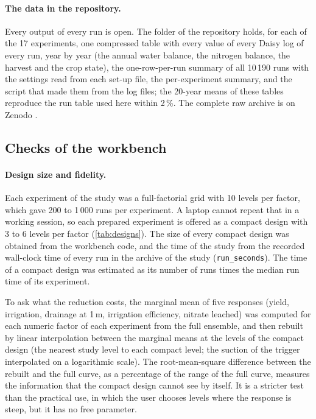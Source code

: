 \paragraph{The data in the repository.} Every output of every run is open. The folder \cslink{} of the repository holds, for each of the 17 experiments, one compressed table with every value of every Daisy log of every run, year by year (the annual water balance, the nitrogen balance, the harvest and the crop state), the one-row-per-run summary of all 10\,190 runs with the settings read from each set-up file, the per-experiment summary, and the script that made them from the log files; the 20-year means of these tables reproduce the run table used here within 2\,\%. The complete raw archive is on Zenodo \citep{HaliluData}.




\subsection{Checks of the workbench}
\paragraph{Design size and fidelity.}
Each experiment of the study was a full-factorial grid with 10 levels per factor, which gave 200 to 1\,000 runs per experiment. A laptop cannot repeat that in a working session, so each prepared experiment is offered as a compact design with 3 to 6 levels per factor (\cref{tab:designs}). The size of every compact design was obtained from the workbench code, and the time of the study from the recorded wall-clock time of every run in the archive of the study (\texttt{run\_seconds}). The time of a compact design was estimated as its number of runs times the median run time of its experiment.

To ask what the reduction costs, the marginal mean of five responses (yield, irrigation, drainage at 1\,m, irrigation efficiency, nitrate leached) was computed for each numeric factor of each experiment from the full ensemble, and then rebuilt by linear interpolation between the marginal means at the levels of the compact design (the nearest study level to each compact level; the suction of the trigger interpolated on a logarithmic scale). The root-mean-square difference between the rebuilt and the full curve, as a percentage of the range of the full curve, measures the information that the compact design cannot see by itself. It is a stricter test than the practical use, in which the user chooses levels where the response is steep, but it has no free parameter.

